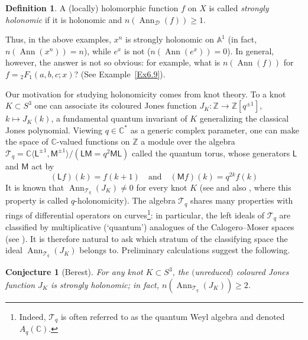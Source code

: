 \documentclass[11pt,reqno]{amsart}
\theoremstyle{plain}
\newtheorem{conjecture}{Conjecture}[section]
\theoremstyle{definition}
\newtheorem{definition}{Definition}
\theoremstyle{remark}
\numberwithin{equation}{section}
\newcommand{\cD}{\mathcal{D}}
\newcommand{\cT}{\mathcal{T}}
\newcommand{\C}{\mathbb{C}}
\newcommand{\Z}{\mathbb{Z}}
\newcommand{\A}{\mathbb{A}}
\newcommand{\lan}{\langle}
\newcommand{\ran}{\rangle}
\DeclareMathOperator{\Ann}{Ann}
\begin{document}
\begin{definition}
\label{D1}
A (locally) holomorphic function $f$ on $X$ is called \emph{strongly holonomic} if it is holonomic and
$n(\Ann_{\cD}(f)) \ge 1$.
\end{definition}

Thus, in the above examples,  $ x^n$ is strongly holonomic on $\A^1$ (in fact, $n(\Ann(x^n)) = n$), while $ e^x$ is not ($n(\Ann(e^x))=0$). In general, however, the answer is not so obvious: for example, what is $n(\Ann(f))$ for $ f = {}_{2}F_1(a,b,c; x) $? (See Example~\ref{Ex6.9}). 


\vspace{1ex}

Our motivation for studying  holonomicity comes from knot theory. To a knot $K \subset S^3$ one  can associate its coloured Jones function $J_K: \Z \to \Z[q^{\pm 1}]$, $k \mapsto J_K(k)$, a fundamental quantum invariant of $K$ generalizing the classical Jones polynomial. 
Viewing $q \in \C^*$ as a generic complex parameter, one can make the space of $\C$-valued functions on 
$\Z$ a module over the algebra $ \cT_q = \C\lan \mathsf{L}^{\pm 1}, \mathsf{M}^{\pm 1} \ran/(\mathsf{L} \mathsf{M} = q^2 \mathsf{M} \mathsf{L})$ called the quantum torus, whose generators $\mathsf{L}$ and $\mathsf{M}$ act by
%
$$
(\mathsf{L} f)(k) = f(k+1) \quad \mbox{and}\quad (\mathsf{M}f)(k) = q^{2k} f(k)
$$
%
It is known that $\Ann_{\cT_q}(J_K) \ne 0$ for every knot $K$ (see \cite{GaroufalidisLe2005} and also \cite{Le16}, where this property is
called $q$-holonomicity). The algebra $\cT_q$ shares many properties with rings of differential operators on curves\footnote{Indeed, $\cT_q$ is often referred to as the quantum Weyl algebra and denoted $A_q(\C)$.}: in particular, the left ideals of $\cT_q$ are classified by  multiplicative (`quantum') analogues of the Calogero--Moser spaces (see \cite{BCquantum, Berest2013picard}). It is therefore natural to ask
which stratum of the classifying space the ideal $\Ann_{\cT_q}(J_K)$ belongs to. Preliminary
calculations suggest the following.

\begin{conjecture}[Berest]
\label{Conj}
For any knot $K \subset S^3$, the $($unreduced$)$ coloured Jones function $J_K$ is strongly holonomic;
in fact, $n(\Ann_{\cT_q}(J_K)) \ge 2$.
\end{conjecture}
\end{document}
